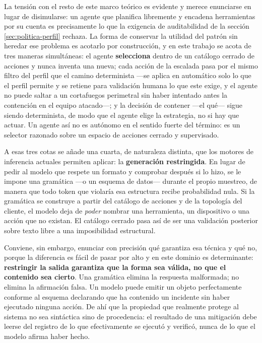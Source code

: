 La tensión con el resto de este marco teórico es evidente y merece enunciarse en lugar de
disimularse: un agente que planifica libremente y encadena herramientas por su cuenta es
precisamente lo que la exigencia de auditabilidad de la sección \ref{sec:politica-perfil} rechaza.
La forma de conservar la utilidad del patrón sin heredar ese problema es acotarlo por construcción,
y en este trabajo se acota de tres maneras simultáneas: el agente \textbf{selecciona} dentro de un
catálogo cerrado de acciones y nunca inventa una nueva; cada acción de la escalada pasa por el
mismo filtro del perfil que el camino determinista ---se aplica en automático solo lo que el
perfil permite y se retiene para validación humana lo que este exige, y el agente no puede saltar
a un cortafuegos perimetral sin haber intentado antes la contención en el equipo atacado---; y la
decisión de contener ---el qué--- sigue
siendo determinista, de modo que el agente elige la estrategia, no si hay que actuar. Un agente así
no es autónomo en el sentido fuerte del término: es un selector razonado sobre un espacio de
acciones cerrado y supervisado.

A esas tres cotas se añade una cuarta, de naturaleza distinta, que los motores de inferencia
actuales permiten aplicar: la \textbf{generación restringida}. En lugar de pedir al modelo que
respete un formato y comprobar después si lo hizo, se le impone una gramática ---o un esquema de
datos--- durante el propio muestreo, de manera que todo token que violaría esa estructura recibe
probabilidad nula. Si la gramática se construye a partir del catálogo de acciones y de la topología
del cliente, el modelo deja de \emph{poder} nombrar una herramienta, un dispositivo o una acción que
no existan. El catálogo cerrado pasa así de ser una validación posterior sobre texto libre a una
imposibilidad estructural.

Conviene, sin embargo, enunciar con precisión qué garantiza esa técnica y qué no, porque la
diferencia es fácil de pasar por alto y en este dominio es determinante: \textbf{restringir la salida
garantiza que la forma sea válida, no que el contenido sea cierto}. Una gramática elimina la
respuesta malformada; no elimina la afirmación falsa. Un modelo puede emitir un objeto perfectamente
conforme al esquema declarando que ha contenido un incidente sin haber ejecutado ninguna acción. De
ahí que la propiedad que realmente protege al sistema no sea sintáctica sino de procedencia: el
resultado de una mitigación debe leerse del registro de lo que efectivamente se ejecutó y verificó,
nunca de lo que el modelo afirma haber hecho.

